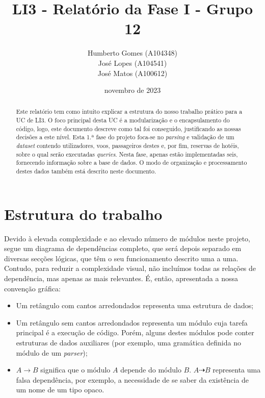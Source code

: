 \documentclass[12pt, a4paper]{article}
\title{\textbf{LI3 - Relatório da Fase I - Grupo 12}}
\author{
    Humberto Gomes (A104348) \\
    José Lopes     (A104541) \\
    José Matos     (A100612) \\
}
\date{novembro de 2023}
\begin{document}
\maketitle
\onehalfspacing
\setlength{\parskip}{\baselineskip}
\setlength{\parindent}{0pt}

\begin{abstract}
    Este relatório tem como intuito explicar a estrutura do nosso trabalho prático para a UC de LI3.
    O foco principal desta UC é a modularização e o encapsulamento do código, logo, este documento
    descreve como tal foi conseguido, justificando as nossas decisões a este nível. Esta 1.ª fase do
    projeto foca-se no \emph{parsing} e validação de um \emph{dataset} contendo utilizadores, voos,
    passageiros destes e, por fim, reservas de hotéis, sobre o qual serão executadas \emph{queries}.
    Nesta fase, apenas estão implementadas seis, fornecendo informação sobre a base de dados. O
    modo de organização e processamento destes dados também está descrito neste documento.
\end{abstract}

\section{Estrutura do trabalho}

Devido à elevada complexidade e ao elevado número de módulos neste projeto, segue um diagrama de
dependências completo, que será depois separado em diversas secções lógicas, que têm o seu
funcionamento descrito uma a uma. Contudo, para reduzir a complexidade visual, não incluímos
todas as relações de dependência, mas apenas as mais relevantes. É, então, apresentada a
nossa convenção gráfica:

\begin{itemize}
    \item Um retângulo com cantos arredondados representa uma estrutura de dados;
    \item Um retângulo sem cantos arredondados representa um módulo cuja tarefa principal é a
          execução de código. Porém, alguns destes módulos pode conter estruturas de dados
          auxiliares (por exemplo, uma gramática definida no módulo de um \emph{parser});
    \item $A \rightarrow B$ significa que o módulo $A$ depende do módulo $B$. $A \dashrightarrow B$
          representa uma falsa dependência, por exemplo, a necessidade de se saber da existência
          de um nome de um tipo opaco.
\end{itemize}
\end{document}

